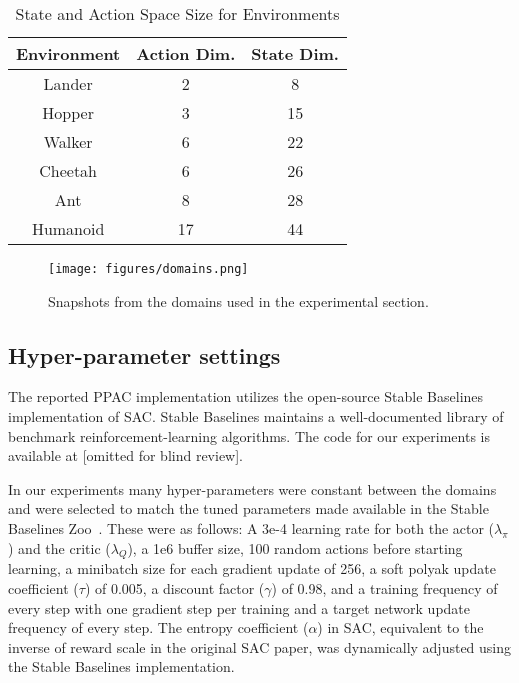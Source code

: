 \documentclass{article}
\begin{document}
            \begin{center}
                \begin{table}
                    \centering
                    \caption{State and Action Space Size for Environments}
                    \begin{tabular}{ | c c c | }
                        \hline
                        Environment & Action Dim. & State Dim. \\
                        \hline
                        Lander & 2 & 8 \\ 
                        Hopper & 3 & 15 \\  
                        Walker & 6 & 22 \\    
                        Cheetah & 6 & 26 \\  
                        Ant & 8 & 28 \\  
                        Humanoid & 17 & 44 \\
                        \hline
                    \end{tabular}
                    \label{table:state-action-dim}
                \end{table}
            \end{center}


            \begin{figure}
                \texttt{[image: figures/domains.png]}
                \caption{Snapshots from the domains used in the experimental section.}
                \label{domains}
            \end{figure}

        \subsection{Hyper-parameter settings}

            The reported PPAC implementation utilizes the open-source Stable Baselines~\cite{stable-baselines} implementation of SAC. Stable Baselines maintains a well-documented library of benchmark reinforcement-learning algorithms. The code for our experiments is available at [omitted for blind review].

            In our experiments many hyper-parameters were constant between the domains and were selected to match the tuned parameters made available in the Stable Baselines Zoo~\cite{rl-zoo3}. These were as follows: A 3e-4 learning rate for both the actor ($\lambda_\pi$) and the critic ($\lambda_Q$), a 1e6 buffer size, 100 random actions before starting learning, a minibatch size for each gradient update of 256, a soft polyak update coefficient ($\tau$) of 0.005, a discount factor ($\gamma$) of 0.98, and a training frequency of every step with one gradient step per training and a target network update frequency of every step.
            The entropy coefficient ($\alpha$) in SAC, equivalent to the inverse of reward scale in the original SAC paper, was dynamically adjusted using the Stable Baselines implementation.
\end{document}
